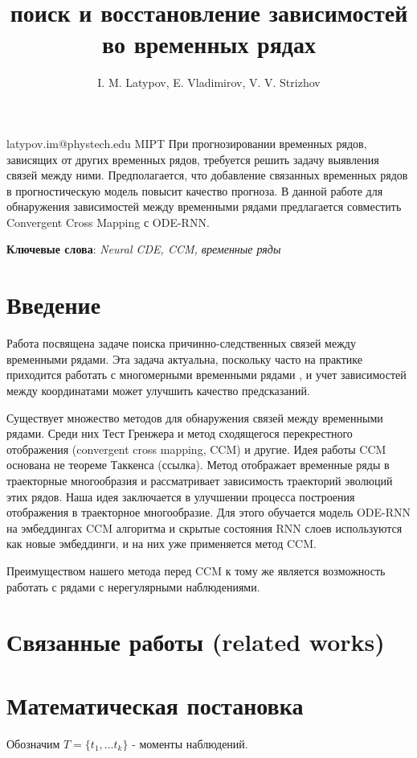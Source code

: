 \documentclass[12pt, twoside]{article}
\begin{document}
\title
	[поиск и восстановление зависимостей во временных рядах]
	{поиск и восстановление зависимостей во временных рядах}
\author
	[I. M. Latypov]
	{I. M. Latypov, E. Vladimirov, V. V. Strizhov}
\email
	{latypov.im@phystech.edu}
\organization	
	{MIPT}	
\abstract
	{
		При прогнозировании временных рядов, зависящих от других временных рядов, требуется решить задачу выявления связей между ними.
		Предполагается, что добавление связанных временных рядов в прогностическую модель повысит качество прогноза. В данной работе для
		обнаружения зависимостей между временными рядами предлагается совместить Convergent Cross Mapping с ODE-RNN. 
		}
\bigskip
\noindent

\maketitle
\textbf{Ключевые слова}: \emph{Neural CDE, CCM, временные ряды}

\section{Введение}
	Работа посвящена задаче поиска причинно-следственных связей между временными рядами.
	Эта задача актуальна, поскольку часто на практике приходится работать с многомерными временными рядами \citet{eural_ODE}, и учет зависимостей между координатами может улучшить качество предсказаний. 
		
		Существует множество методов для обнаружения связей между временными рядами. Среди них Тест Гренжера и метод сходящегося перекрестного отображения
	(convergent cross mapping, CCM) и другие. Идея работы CCM основана не теореме Таккенса (ссылка). Метод отображает временные ряды в траекторные многообразия и рассматривает зависимость траекторий эволюций этих рядов. Наша идея заключается в улучшении процесса построения отображения в траекторное многообразие. Для этого обучается модель ODE-RNN на эмбеддингах CCM алгоритма и скрытые состояния RNN слоев используются как новые эмбеддинги, и на них уже применяется метод CCM. 
		
		Преимуществом нашего метода перед CCM к тому же является возможность работать с рядами с нерегулярными наблюдениями.
	
	
\section{Связанные работы (related works)}
		
	
\section{Математическая постановка}
Обозначим $T = \{t_1, ... t_k\}$ - моменты наблюдений.
\end{document}
